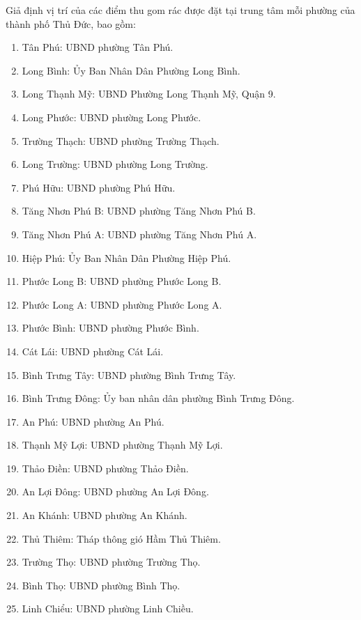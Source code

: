         \quad Giả định vị trí của các điểm thu gom rác được đặt tại trung tâm mỗi phường của thành phố Thủ Đức, bao gồm:
        \begin{enumerate}
            \item Tân Phú: UBND phường Tân Phú.
            \item Long Bình: Ủy Ban Nhân Dân Phường Long Bình.
            \item Long Thạnh Mỹ: UBND Phường Long Thạnh Mỹ, Quận 9.
            \item Long Phước: UBND phường Long Phước.
            \item Trường Thạch: UBND phường Trường Thạch.
            \item Long Trường: UBND phường Long Trường.
            \item Phú Hữu: UBND phường Phú Hữu.
            \item Tăng Nhơn Phú B: UBND phường Tăng Nhơn Phú B.
            \item Tăng Nhơn Phú A: UBND phường Tăng Nhơn Phú A.
            \item Hiệp Phú: Ủy Ban Nhân Dân Phường Hiệp Phú.
            \item Phước Long B: UBND phường Phước Long B.
            \item Phước Long A: UBND phường Phước Long A.
            \item Phước Bình: UBND phường Phước Bình.
            \item Cát Lái: UBND phường Cát Lái.
            \item Bình Trưng Tây: UBND phường Bình Trưng Tây.
            \item Bình Trưng Đông: Ủy ban nhân dân phường Bình Trưng Đông.
            \item An Phú: UBND phường An Phú.
            \item Thạnh Mỹ Lợi: UBND phường Thạnh Mỹ Lợi. 
            \item Thảo Điền: UBND phường Thảo Điền.
            \item An Lợi Đông: UBND phường An Lợi Đông.
            \item An Khánh: UBND phường An Khánh.
            \item Thủ Thiêm: Tháp thông gió Hầm Thủ Thiêm.
            \item Trường Thọ: UBND phường Trường Thọ.
            \item Bình Thọ: UBND phường Bình Thọ.
            \item Linh Chiểu: UBND phường Linh Chiều.

\end{enumerate}
